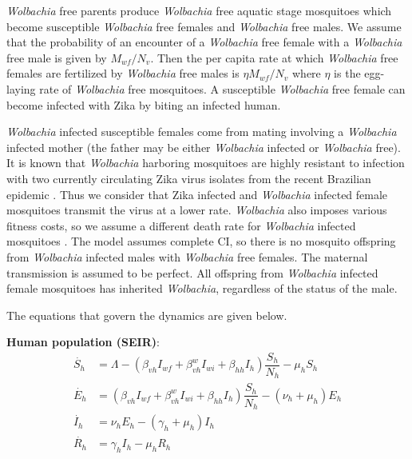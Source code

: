 \documentclass{ws-rv9x6}
\begin{document}
\textit{Wolbachia} free parents produce \textit{Wolbachia} free aquatic stage mosquitoes which become susceptible \textit{Wolbachia} free females and \textit{Wolbachia} free males. %
We assume that the probability of an encounter of a \textit{Wolbachia} free female with a \textit{Wolbachia} free male is given by $M_{wf}/N_v$. Then the per capita rate at which \textit{Wolbachia} free females are fertilized by \textit{Wolbachia} free males is $\eta M_{wf}/N_v$ where $\eta$ is the egg-laying rate of \textit{Wolbachia} free mosquitoes. A susceptible \textit{Wolbachia} free female can become infected with Zika by biting an infected human.

\textit{Wolbachia} infected susceptible females come from mating involving a \textit{Wolbachia} infected mother (the father may be either \textit{Wolbachia} infected or \textit{Wolbachia} free). It is known that \textit{Wolbachia} harboring mosquitoes are highly resistant to infection with two currently circulating Zika virus isolates from the recent Brazilian epidemic \cite{dutra2016wolbachia}. Thus we consider that Zika infected and \textit{Wolbachia} infected female mosquitoes transmit the virus at a lower rate. \textit{Wolbachia} also imposes various fitness costs, so we assume a different death rate for \textit{Wolbachia} infected mosquitoes \cite{mcmeniman2009stable}. The model assumes complete CI, so there is no mosquito offspring from \textit{Wolbachia} infected males with \textit{Wolbachia} free females. The maternal transmission is assumed to be perfect. All offspring from \textit{Wolbachia} infected female mosquitoes has inherited \textit{Wolbachia}, regardless of the status of the male.

The equations that govern the dynamics are given below. 

\noindent \textbf{Human population (SEIR)}:
\begin{align}
\label{eq:1}\dot{S_h} & =\Lambda-(\beta_{vh}I_{wf}+\beta^w_{vh}I_{wi}+\beta_{hh}I_h)\dfrac{S_h}{N_h}-\mu_h S_h\\
\label{eq:2}\dot{E_h} &= (\beta_{vh}I_{wf}+\beta^w_{vh}I_{wi}+\beta_{hh}I_h)\dfrac{S_h}{N_h} - (\nu_h+\mu_h)E_h\\
\label{eq:3}\dot{I_h} &= \nu_h E_h - (\gamma_h + \mu_h)I_h\\ 
\label{eq:4}\dot{R_h} &= \gamma_h I_h-\mu_h R_h
\end{align}
\end{document}
